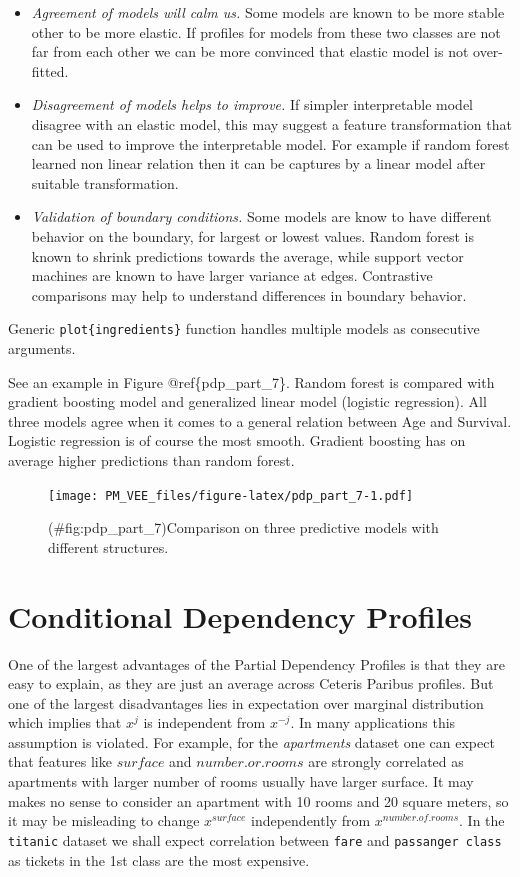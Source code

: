 \documentclass[12pt,]{krantz}
\providecommand{\tightlist}{%
  \setlength{\itemsep}{0pt}\setlength{\parskip}{0pt}}
\theoremstyle{definition}
\theoremstyle{definition}
\theoremstyle{definition}
\theoremstyle{remark}
\begin{document}
\begin{itemize}
\tightlist
\item
  \emph{Agreement of models will calm us.} Some models are known to be
  more stable other to be more elastic. If profiles for models from
  these two classes are not far from each other we can be more convinced
  that elastic model is not over-fitted.
\item
  \emph{Disagreement of models helps to improve.} If simpler
  interpretable model disagree with an elastic model, this may suggest a
  feature transformation that can be used to improve the interpretable
  model. For example if random forest learned non linear relation then
  it can be captures by a linear model after suitable transformation.
\item
  \emph{Validation of boundary conditions.} Some models are know to have
  different behavior on the boundary, for largest or lowest values.
  Random forest is known to shrink predictions towards the average,
  while support vector machines are known to have larger variance at
  edges. Contrastive comparisons may help to understand differences in
  boundary behavior.
\end{itemize}

Generic \texttt{plot\{ingredients\}} function handles multiple models as
consecutive arguments.

See an example in Figure @ref\{pdp\_part\_7\}. Random forest is compared
with gradient boosting model and generalized linear model (logistic
regression). All three models agree when it comes to a general relation
between Age and Survival. Logistic regression is of course the most
smooth. Gradient boosting has on average higher predictions than random
forest.

\begin{figure}
\centering
\texttt{[image: PM\_VEE\_files/figure-latex/pdp\_part\_7-1.pdf]}
\caption{(\#fig:pdp\_part\_7)Comparison on three predictive models with
different structures.}
\end{figure}

\hypertarget{conditionalProfiles}{%
\section{Conditional Dependency Profiles}\label{conditionalProfiles}}

One of the largest advantages of the Partial Dependency Profiles is that
they are easy to explain, as they are just an average across Ceteris
Paribus profiles. But one of the largest disadvantages lies in
expectation over marginal distribution which implies that \(x^j\) is
independent from \(x^{-j}\). In many applications this assumption is
violated. For example, for the \emph{apartments} dataset one can expect
that features like \(surface\) and \(number.or.rooms\) are strongly
correlated as apartments with larger number of rooms usually have larger
surface. It may makes no sense to consider an apartment with 10 rooms
and 20 square meters, so it may be misleading to change \(x^{surface}\)
independently from \(x^{number.of.rooms}\). In the \texttt{titanic}
dataset we shall expect correlation between \texttt{fare} and
\texttt{passanger\ class} as tickets in the 1st class are the most
expensive.
\end{document}
